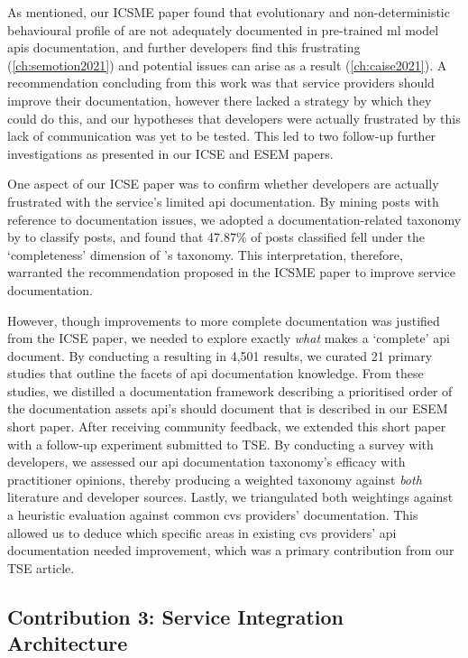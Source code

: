 As mentioned, our ICSME paper found that evolutionary and non-deterministic behavioural profile of are not adequately documented in pre-trained \gls{ml} model \glspl{api} documentation, and further developers find this frustrating (\cref{ch:semotion2021}) and potential issues can arise as a result (\cref{ch:caise2021}). A recommendation concluding from this work was that service providers should improve their documentation, however there lacked a strategy by which they could do this, and our hypotheses that developers were actually frustrated by this lack of communication was yet to be tested. This led to two follow-up further investigations as presented in our ICSE and ESEM papers.

One aspect of our ICSE paper was to confirm whether developers are actually frustrated with the service's limited \gls{api} documentation. By mining  posts with reference to documentation issues, we adopted a \citeyear{Aghajani:2019bo} documentation-related taxonomy by \citet{Aghajani:2018et} to classify posts, and found that 47.87\% of posts classified fell under the `completeness' dimension of \citeauthor{Aghajani:2018et}'s taxonomy. This interpretation, therefore, warranted the recommendation proposed in the ICSME paper to improve service documentation. 

However, though improvements to more complete documentation was justified from the ICSE paper, we needed to explore exactly \textit{what} makes a `complete' \gls{api} document. By conducting a  resulting in 4,501 results, we curated 21 primary studies that outline the facets of \gls{api} documentation knowledge. From these studies, we distilled a documentation framework describing a prioritised order of the documentation assets \gls{api}'s should document that is described in our ESEM short paper. After receiving community feedback, we extended this short paper with a follow-up experiment submitted to TSE. By conducting a survey with developers, we assessed our \gls{api} documentation taxonomy's efficacy with practitioner opinions, thereby producing a weighted taxonomy against \textit{both} literature and developer sources. Lastly, we triangulated both weightings against a heuristic evaluation against common \gls{cvs} providers' documentation. This allowed us to deduce which specific areas in existing \gls{cvs} providers' \gls{api} documentation needed improvement, which was a primary contribution from our TSE article.

\subsection{Contribution 3: Service Integration Architecture}

